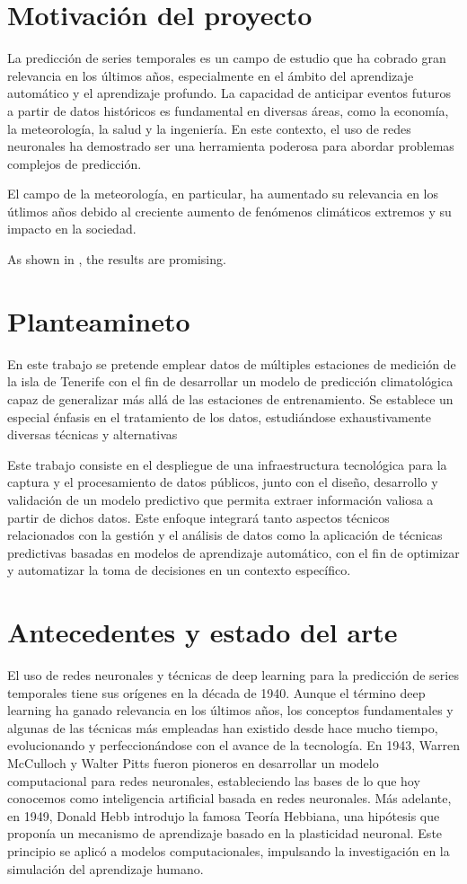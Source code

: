 \section{Motivación del proyecto}
La predicción de series temporales es un campo de estudio que ha cobrado gran relevancia en los últimos años, especialmente en el ámbito del aprendizaje automático y el aprendizaje profundo. 
La capacidad de anticipar eventos futuros a partir de datos históricos es fundamental en diversas áreas, como la economía, la meteorología, la salud y la ingeniería. 
En este contexto, el uso de redes neuronales ha demostrado ser una herramienta poderosa para abordar problemas complejos de predicción.

El campo de la meteorología, en particular, ha aumentado su relevancia en los útlimos años debido al creciente aumento de fenómenos climáticos extremos y su impacto en la sociedad.

As shown in \cite{smith2023}, the results are promising.

\section{Planteamineto}
En este trabajo se pretende emplear datos de múltiples estaciones de medición de la isla de Tenerife con el fin de desarrollar un modelo de predicción climatológica capaz de generalizar más allá de las estaciones de entrenamiento.
Se establece un especial énfasis en el tratamiento de los datos, estudiándose exhaustivamente diversas técnicas y alternativas

Este trabajo consiste en el despliegue de una infraestructura tecnológica para la captura y el procesamiento de datos públicos, 
junto con el diseño, desarrollo y validación de un modelo predictivo que permita extraer información valiosa a partir de dichos datos.
Este enfoque integrará tanto aspectos técnicos relacionados con la gestión y el análisis de datos como la aplicación de técnicas predictivas
basadas en modelos de aprendizaje automático, con el fin de optimizar y automatizar la toma de decisiones en un contexto específico.

\section{Antecedentes y estado del arte}

El uso de redes neuronales y técnicas de deep learning para la predicción de series temporales tiene sus orígenes en la década de 1940. Aunque el término deep learning ha ganado relevancia en los últimos años, los conceptos fundamentales y algunas de las técnicas más empleadas han existido desde hace mucho tiempo, evolucionando y perfeccionándose con el avance de la tecnología.
En 1943, Warren McCulloch y Walter Pitts fueron pioneros en desarrollar un modelo computacional para redes neuronales, estableciendo las bases de lo que hoy conocemos como inteligencia artificial basada en redes neuronales. Más adelante, en 1949, Donald Hebb introdujo la famosa Teoría Hebbiana, una hipótesis que proponía un mecanismo de aprendizaje basado en la plasticidad neuronal. Este principio se aplicó a modelos computacionales, impulsando la investigación en la simulación del aprendizaje humano.


